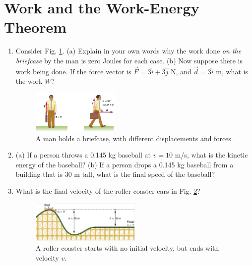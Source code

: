 \documentclass[10pt]{article}
\begin{document}
\section{Work and the Work-Energy Theorem}
\begin{enumerate}
\item Consider Fig. \ref{fig:brief}.  (a) Explain in your own words why the work done \textit{on the briefcase} by the man is zero Joules for each case. (b) Now suppose there is work being done.  If the force vector is $\vec{F} = 3 \hat{i} + 3\hat{j}$ N, and $\vec{d} = 3\hat{i}$ m, what is the work $W$?
\begin{figure}[ht]
\centering
\includegraphics[width=0.4\textwidth]{figures/briefcase.png}
\caption{\label{fig:brief} A man holds a briefcase, with different displacements and forces.}
\end{figure}
\item (a) If a person throws a 0.145 kg baseball at $v=10$ m/s, what is the kinetic energy of the baseball?  (b) If a person drops a 0.145 kg baseball from a building that is 30 m tall, what is the final speed of the baseball? \\ \vspace{1cm}
\item What is the final velocity of the roller coaster cars in Fig. \ref{fig:coaster}?
\begin{figure}[ht]
\centering
\includegraphics[width=0.5\textwidth]{figures/coaster.png}
\caption{\label{fig:coaster} A roller coaster starts with no initial velocity, but ends with velocity $v$.}
\end{figure}
\end{enumerate}
\end{document}
